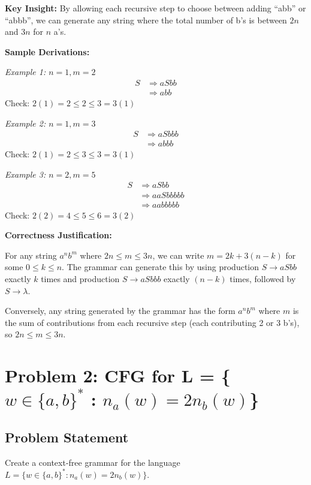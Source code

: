 \documentclass[12pt]{article}
\begin{document}
\textbf{Key Insight:} By allowing each recursive step to choose between adding ``abb'' or ``abbb'', we can generate any string where the total number of b's is between $2n$ and $3n$ for $n$ a's.

\textbf{Sample Derivations:}

\textit{Example 1: $n=1, m=2$}
\begin{align*}
S &\Rightarrow aSbb \\
  &\Rightarrow abb
\end{align*}
Check: $2(1) = 2 \leq 2 \leq 3 = 3(1)$ \checkmark

\textit{Example 2: $n=1, m=3$}
\begin{align*}
S &\Rightarrow aSbbb \\
  &\Rightarrow abbb
\end{align*}
Check: $2(1) = 2 \leq 3 \leq 3 = 3(1)$ \checkmark

\textit{Example 3: $n=2, m=5$}
\begin{align*}
S &\Rightarrow aSbb \\
  &\Rightarrow aaSbbbbb \\
  &\Rightarrow aabbbbb
\end{align*}
Check: $2(2) = 4 \leq 5 \leq 6 = 3(2)$ \checkmark

\textbf{Correctness Justification:}

For any string $a^n b^m$ where $2n \leq m \leq 3n$, we can write $m = 2k + 3(n-k)$ for some $0 \leq k \leq n$. The grammar can generate this by using production $S \to aSbb$ exactly $k$ times and production $S \to aSbbb$ exactly $(n-k)$ times, followed by $S \to \lambda$.

Conversely, any string generated by the grammar has the form $a^n b^m$ where $m$ is the sum of contributions from each recursive step (each contributing 2 or 3 b's), so $2n \leq m \leq 3n$.


\section{Problem 2: CFG for L = \{$w \in \{a,b\}^*$ : $n_a(w) = 2n_b(w)$\}}

\subsection{Problem Statement}
Create a context-free grammar for the language $L = \{w \in \{a,b\}^* : n_a(w) = 2n_b(w)\}$.
\end{document}
